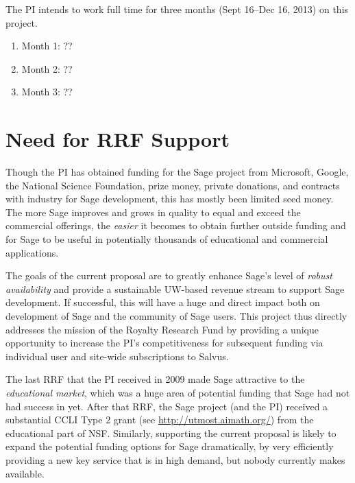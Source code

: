 \documentclass[11pt]{article}
\begin{document}
The PI intends to work full time for three months (Sept 16--Dec 16, 2013) on this project.

\begin{enumerate}
\item Month 1: ??
\item Month 2: ??
\item Month 3: ??
\end{enumerate}


\section{Need for RRF Support}

Though the PI has obtained funding for the Sage project from
Microsoft, Google, the National Science Foundation, prize money,
private donations, and contracts with industry for Sage development,
this has mostly been limited seed money.  The more Sage improves and
grows in quality to equal and exceed the commercial offerings, the
{\em easier} it becomes to obtain further outside funding and for Sage
to be useful in potentially thousands of educational and commercial
applications.

The goals of the current proposal are to greatly enhance Sage's level
of {\em robust availability} and provide a sustainable UW-based
revenue stream to support Sage development.  If successful, this will
have a huge and direct impact both on development of Sage and the
community of Sage users.  This project thus directly addresses the
mission of the Royalty Research Fund by providing a unique opportunity
to increase the PI's competitiveness for subsequent funding via
individual user and site-wide subscriptions to Salvus.

The last RRF that the PI received in 2009 made Sage attractive to the
{\em educational market}, which was a huge area of potential funding
that Sage had not had success in yet.  After that RRF, the Sage
project (and the PI) received a substantial CCLI Type 2 grant (see
\url{http://utmost.aimath.org/}) from the educational part of NSF.
Similarly, supporting the current proposal is likely to expand the
potential funding options for Sage dramatically, by very efficiently
providing a new key service that is in high demand, but nobody
currently makes available.
\end{document}
